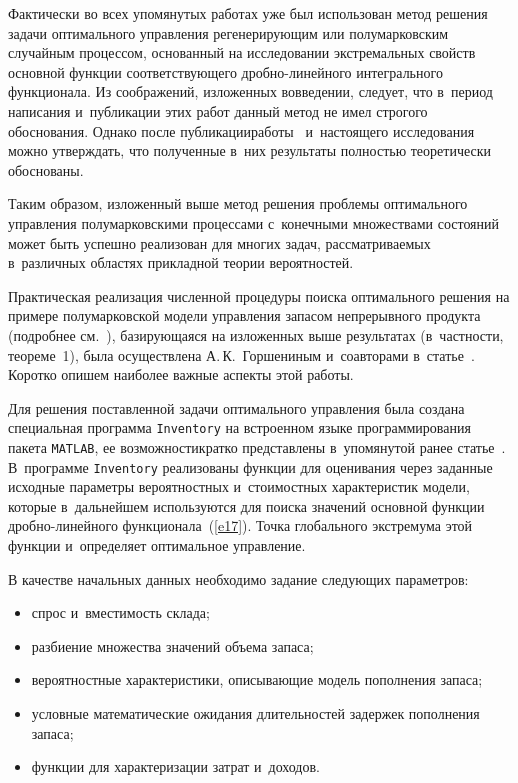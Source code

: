 \begin{multicols}{2}
Фактически во всех упомянутых работах уже был использован метод решения задачи 
оптимального управления регенерирующим или полумарковским случайным процессом, 
основанный на исследовании экстремальных свойств основной функции соответствующего 
дроб\-но-ли\-ней\-но\-го интегрального функционала. Из соображений, изложенных 
во\linebreak введении, следует, что в~период написания и~пуб\-ли\-кации этих работ данный метод 
не имел стро\-гого обоснования. Однако после публикации\linebreak работы~\cite{14} и~настоящего 
исследования можно утверж\-дать, что полученные в~них результаты полностью теоретически 
обоснованы.

Таким образом, изложенный выше метод решения проблемы оптимального управления 
полумарковскими процессами с~конечными множествами состояний может быть успешно 
реализован для многих задач, рассматриваемых в~различных областях прикладной 
теории вероятностей.

Практическая реализация численной процедуры поиска оптимального решения на примере\linebreak 
полумарковской модели управления запасом непрерывного продукта (подробнее 
см.~\cite{21, 29}), ба\-зи\-ру\-юща\-яся на изложенных выше результатах (в~частности, 
теореме~1), была осуществлена А.\,К.~Горшениным и~соавторами 
в~статье~\cite{Gorshenin2015}. Коротко опишем наиболее важные аспекты этой работы.

Для решения поставленной задачи опти\-мального управления была создана 
специальная программа \verb"Inventory" на встроенном языке программирования 
пакета \verb"MATLAB", ее возможности\linebreak кратко представле\-ны в~упомянутой ранее 
\mbox{статье}~\cite{Gorshenin2015}. В~программе \verb"Inventory" реализованы функции 
для оценивания через заданные исходные параметры вероятностных и~стоимостных 
характеристик модели, которые в~дальнейшем используются для поиска значений 
основной функции дроб\-но-ли\-ней\-но\-го функционала~(\ref{e17}). Точка глобального 
экстремума этой функции и~определяет оптимальное управление.

В качестве начальных данных необходимо задание следующих параметров:
\begin{itemize}
\item спрос и~вместимость склада;
\item разбиение множества значений объема запаса;
\item вероятностные характеристики, описывающие модель пополнения запаса;
\item условные математические ожидания длительностей задержек пополнения запаса;
\item функции для характеризации затрат и~доходов.
\end{itemize}


\end{multicols}
